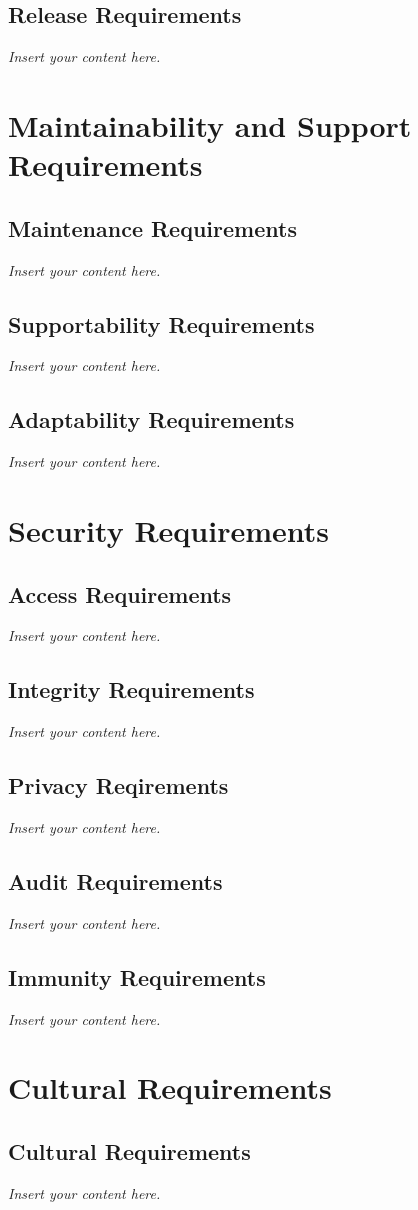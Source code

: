\documentclass[a4paper, 12pt,twoside]{article}
\newcommand{\lips}{\textit{Insert your content here.}}
\begin{document}
\subsection{Release Requirements}
\lips

\section{Maintainability and Support Requirements}
\subsection{Maintenance Requirements}
\lips
\subsection{Supportability Requirements}
\lips
\subsection{Adaptability Requirements}
\lips

\section{Security Requirements}
\subsection{Access Requirements}
\lips
\subsection{Integrity Requirements}
\lips
\subsection{Privacy Reqirements}
\lips
\subsection{Audit Requirements}
\lips
\subsection{Immunity Requirements}
\lips

\section{Cultural Requirements}
\subsection{Cultural Requirements}
\lips
\end{document}
